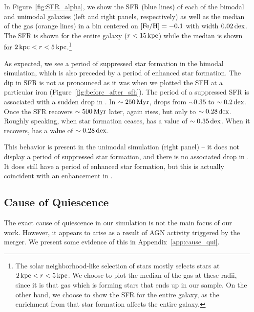 In Figure~\ref{fig:SFR_alpha}, we show the SFR (blue lines) of each of the bimodal and unimodal galaxies (left and right panels, respectively) as well as the median \MgFe{} of the gas (orange lines) in a bin centered on $[\textrm{Fe}/\textrm{H}]{}=-0.1$ with width $0.02\,\textrm{dex}$. The SFR is shown for the entire galaxy ($r<15\,\textrm{kpc}$) while the median \MgFe{} is shown for $2\,\textrm{kpc}<r<5\,\textrm{kpc}$.\footnote{The solar neighborhood-like selection of stars mostly selects stars at $2\,\textrm{kpc}<r<5\,\textrm{kpc}$. We choose to plot the median \MgFe{} of the gas at these radii, since it is that gas which is forming stars that ends up in our sample. On the other hand, we choose to show the SFR for the entire galaxy, as the enrichment from that star formation affects the entire galaxy.} 

As expected, we see a period of suppressed star formation in the bimodal simulation, which is also preceded by a period of enhanced star formation. The dip in SFR is not as pronounced as it was when we plotted the SFH at a particular iron (Figure~\ref{fig:before_after_sfh}). The period of a suppressed SFR is associated with a sudden drop in \MgFe{}. In $\sim250\,\textrm{Myr}$, \MgFe{} drops from $\sim0.35$ to $\sim0.2\,\textrm{dex}$. Once the SFR recovers $\sim500\,\textrm{Myr}$ later, \MgFe{} again rises, but only to $\sim0.28\,\textrm{dex}$. Roughly speaking, when star formation ceases, \MgFe{} has a value of $\sim0.35\,\textrm{dex}$. When it recovers, \MgFe{} has a value of $\sim0.28\,\textrm{dex}$.

This behavior is present in the unimodal simulation (right panel) -- it does not display a period of suppressed star formation, and there is no associated drop in \MgFe{}. It does still have a period of enhanced star formation, but this is actually coincident with an enhancement in \MgFe{}.

\subsection{Cause of Quiescence}\label{ssec:cause_qui}
The exact cause of quiescence in our simulation is not the main focus of our work. However, it appears to arise as a result of AGN activity triggered by the merger. We present some evidence of this in Appendix~\ref{app:cause_qui}.

